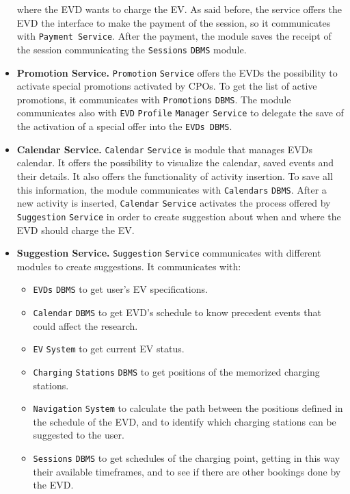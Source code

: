 \begin{itemize}
    where the EVD wants to charge the EV\@.
    As said before, the service offers the EVD the interface to make the payment of the session, so it communicates with
    \verb|Payment Service|.
    After the payment, the module saves the receipt of the session communicating the \verb|Sessions| \verb|DBMS| module.
    \item \textbf{Promotion Service.} \verb|Promotion| \verb|Service| offers the EVDs the possibility to activate special promotions
    activated by CPOs.
    To get the list of active promotions, it communicates with \verb|Promotions| \verb|DBMS|.
    The module communicates also with \verb|EVD| \verb|Profile| \verb|Manager| \verb|Service| to delegate the save of the activation of a special offer into
    the \verb|EVDs DBMS|.
    \item \textbf{Calendar Service.} \verb|Calendar| \verb|Service| is module that manages EVDs calendar.
    It offers the possibility to visualize the calendar, saved events and their details.
    It also offers the functionality of activity insertion.
    To save all this information, the module communicates with \verb|Calendars| \verb|DBMS|.
    After a new activity is inserted, \verb|Calendar| \verb|Service| activates the process offered by \verb|Suggestion| \verb|Service|
    in order to create suggestion about when and where the EVD should charge the EV\@.
    \item \textbf{Suggestion Service.} \verb|Suggestion| \verb|Service| communicates with different modules to create suggestions.
    It communicates with:
    \begin{itemize}
        \item \verb|EVDs| \verb|DBMS| to get user's EV specifications.
        \item \verb|Calendar| \verb|DBMS| to get EVD's schedule to know precedent events that could affect the research.
        \item \verb|EV| \verb|System| to get current EV status.
        \item \verb|Charging| \verb|Stations| \verb|DBMS| to get positions of the memorized charging stations.
        \item \verb|Navigation| \verb|System| to calculate the path between the positions defined in the schedule of the EVD,
        and to identify which charging stations can be suggested to the user.
        \item \verb|Sessions| \verb|DBMS| to get schedules of the charging point, getting in this way their available timeframes,
        and to see if there are other bookings done by the EVD\@.

\end{itemize}
\end{itemize}

